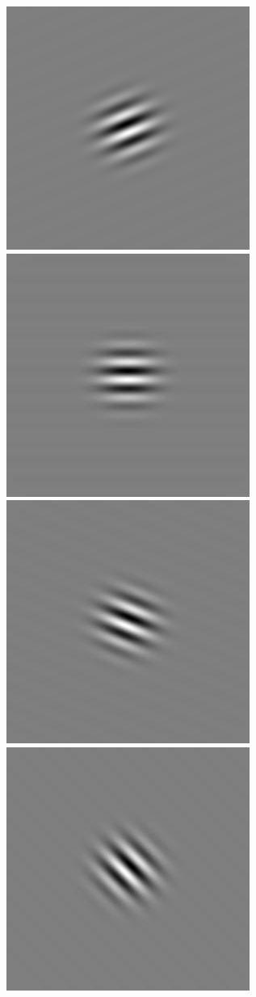 \begin{figure}
\begin{center}
 \includegraphics[scale=0.1]{ch4/figures/iGabor4_3.jpg}
 \includegraphics[scale=0.1]{ch4/figures/iGabor4_4.jpg}
 \includegraphics[scale=0.1]{ch4/figures/iGabor4_5.jpg}
 \includegraphics[scale=0.1]{ch4/figures/iGabor4_6.jpg}

\end{center}
\end{figure}
